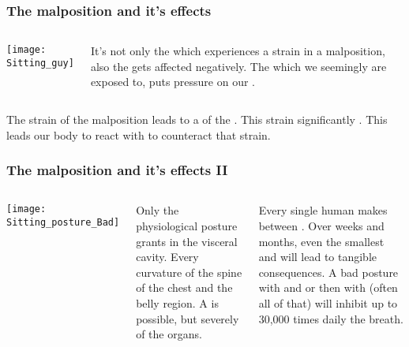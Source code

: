 \begin{frame}
\frametitle{The malposition and it's effects}
\hypertarget{malposition}{}
\begin{columns}[c] %


\texttt{[image: Sitting\_guy]}

It's not only the  which experiences a strain in a malposition, also the  gets affected negatively. The  which we seemingly are exposed to, puts pressure on our .


\end{columns}
The strain of the malposition leads to a  of the . This strain significantly . This leads our body to react with  to counteract that strain.


\end{frame}

\begin{frame}
\frametitle{The malposition and it's effects II}
\begin{columns}[c] %


\texttt{[image: Sitting\_posture\_Bad]}

Only the physiological posture grants  in the visceral cavity. Every curvature of the spine  of the chest and the belly region. A  is possible, but severely  of the organs.

Every single human makes between . Over weeks and months, even the smallest  and will lead to tangible consequences. A bad posture with  and  or then  with  (often all of that) will inhibit up to 30,000 times daily the breath.
\end{columns}


\end{frame}

